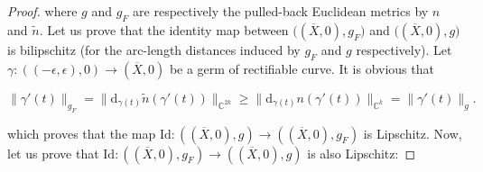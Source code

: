 \documentclass[reqno,dvipsnames,12pt]{amsart}
\begin{document}
\begin{proof}
where $g$ and $g_F$ are respectively the pulled-back Euclidean metrics by $n$ and $\widetilde{n}$. 
Let us prove that the identity map between $\bigl((\overline{X},0), g_F\bigr)$ and $\bigl((\overline{X},0), g\bigr)$ is bilipschitz (for the arc-length distances induced by $g_F$ and $g$ respectively). 
Let $\gamma:\left((-\epsilon,\epsilon),0\right)\longrightarrow (\overline{X},0)$ be a germ of rectifiable curve. 
It is obvious that

$$ 
\|\gamma'(t)\|_{g_F}
=
\|\mathrm{d}_{\gamma(t)}\widetilde{n}(\gamma'(t))\|_{\mathbb{C}^{2k}}
\ge
\|\mathrm{d}_{\gamma(t)}n(\gamma'(t))\|_{\mathbb{C}^{k}}
=
\|\gamma'(t)\|_{g}.
$$

which proves that the map $\mathrm{Id}:\left( (\overline{X},0), g\right) \longrightarrow  \left( (\overline{X},0), g_F \right) $ is Lipschitz. Now, let us prove that $\mathrm{Id}:\left( (\overline{X},0), g_F\right) \longrightarrow  \left( (\overline{X},0), g \right) $ is also Lipschitz: 








\end{proof}
\end{document}
